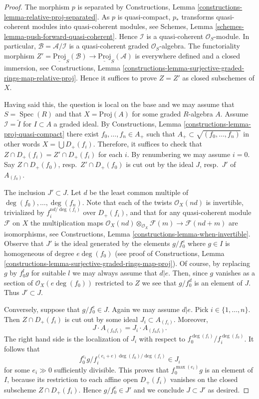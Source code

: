\documentclass[10pt,a4paper]{amsart}
\theoremstyle{plain}
\theoremstyle{definition}
\theoremstyle{remark}
\numberwithin{equation}{subsection}
\def\Spec{\mathop{\mathrm{Spec}}}
\begin{document}
\begin{proof}
The morphism $p$ is separated by
Constructions, Lemma \ref{constructions-lemma-relative-proj-separated}.
As $p$ is quasi-compact, $p_*$ transforms quasi-coherent modules
into quasi-coherent modules, see
Schemes, Lemma \ref{schemes-lemma-push-forward-quasi-coherent}.
Hence $\mathcal{I}$ is a quasi-coherent $\mathcal{O}_S$-module.
In particular, $\mathcal{B} = \mathcal{A}/\mathcal{I}$ is a
quasi-coherent graded $\mathcal{O}_S$-algebra. The functoriality
morphism $Z' = \underline{\text{Proj}}_S(\mathcal{B}) \to
\underline{\text{Proj}}_S(\mathcal{A})$ is everywhere defined and
a closed immersion, see Constructions, Lemma
\ref{constructions-lemma-surjective-graded-rings-map-relative-proj}.
Hence it suffices to prove $Z = Z'$ as closed subschemes of $X$.

\medskip\noindent
Having said this, the question is local on the base and we may assume
that $S = \Spec(R)$ and that $X = \text{Proj}(A)$ for some
graded $R$-algebra $A$. Assume $\mathcal{I} = \widetilde{I}$
for $I \subset A$ a graded ideal. By
Constructions, Lemma \ref{constructions-lemma-proj-quasi-compact}
there exist $f_0, \ldots, f_n \in A_{+}$ such that
$A_{+} \subset \sqrt{(f_0, \ldots, f_n)}$ in other words
$X = \bigcup D_{+}(f_i)$. Therefore, it suffices to check that
$Z \cap D_{+}(f_i) = Z' \cap D_{+}(f_i)$ for each $i$.
By renumbering we may assume $i = 0$.
Say $Z \cap D_{+}(f_0)$, resp.\ $Z' \cap D_{+}(f_0)$
is cut out by the ideal $J$, resp.\ $J'$ of $A_{(f_0)}$.

\medskip\noindent
The inclusion $J' \subset J$.
Let $d$ be the least common multiple of $\deg(f_0), \ldots, \deg(f_n)$.
Note that each of the twists $\mathcal{O}_X(nd)$ is invertible, trivialized
by $f_i^{nd/\deg(f_i)}$ over $D_{+}(f_i)$, and that for any quasi-coherent
module $\mathcal{F}$ on $X$ the multiplication maps
$\mathcal{O}_X(nd) \otimes_{\mathcal{O}_X} \mathcal{F}(m)
\to \mathcal{F}(nd + m)$ are isomorphisms, see
Constructions, Lemma \ref{constructions-lemma-when-invertible}.
Observe that $J'$ is the ideal generated by the elements $g/f_0^e$ where
$g \in I$ is homogeneous of degree $e\deg(f_0)$ (see proof of
Constructions, Lemma
\ref{constructions-lemma-surjective-graded-rings-map-proj}).
Of course, by replacing $g$ by $f_0^lg$ for suitable $l$
we may always assume that $d | e$. Then, since $g$ vanishes as a section of
$\mathcal{O}_X(e\deg(f_0))$ restricted to $Z$ we see that
$g/f_0^d$ is an element of $J$. Thus $J' \subset J$.

\medskip\noindent
Conversely, suppose that $g/f_0^e \in J$. Again we may assume $d | e$.
Pick $i \in \{1, \ldots, n\}$. Then $Z \cap D_{+}(f_i)$ is
cut out by some ideal $J_i \subset A_{(f_i)}$. Moreover,
$$
J \cdot A_{(f_0f_i)} = J_i \cdot A_{(f_0f_i)}.
$$
The right hand side is the localization of $J_i$ with respect to
$f_0^{\deg(f_i)}/f_i^{\deg(f_0)}$. It follows that
$$
f_0^{e_i}g/f_i^{(e_i + e)\deg(f_0)/\deg(f_i)} \in J_i
$$
for some $e_i \gg 0$ sufficiently divisible. This proves that
$f_0^{\max(e_i)}g$ is an element of $I$, because its restriction to each
affine open $D_{+}(f_i)$ vanishes on the closed subscheme
$Z \cap D_{+}(f_i)$. Hence $g/f_0^e \in J'$ and we conclude $J \subset J'$
as desired.
\end{proof}
\end{document}
